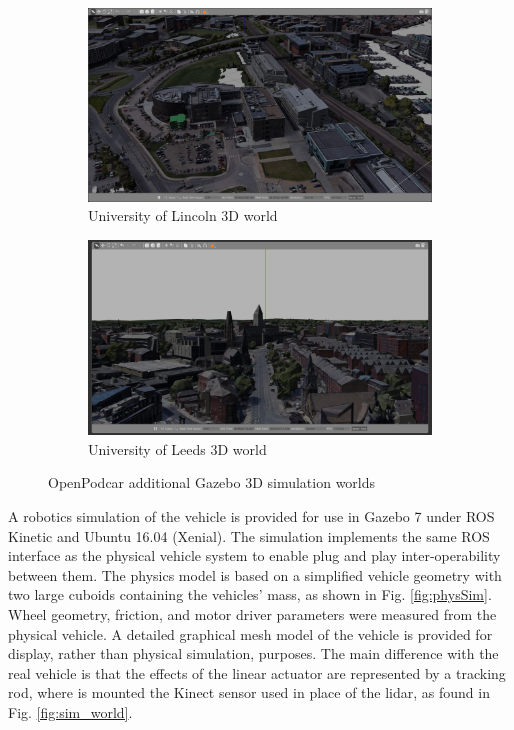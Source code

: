 \documentclass[a4paper]{article}
\begin{document}
	\begin{figure}
		\centering
		\begin{subfigure}{0.45\textwidth}
			\centering
			\includegraphics[width=\columnwidth]{figs_sim/INBLincoln_2.png}
			\caption{University of Lincoln 3D world}
			\label{fig:INB_world}
		\end{subfigure}	
		\quad
		\begin{subfigure}{0.45\textwidth}
			\centering
			\includegraphics[width=\columnwidth]{figs_sim/woodhouseLeeds_5.png}
			\caption{University of Leeds 3D world}
			\label{fig:Leeds_world}
		\end{subfigure}	
		\caption{OpenPodcar additional Gazebo 3D simulation worlds}
		\label{fig:gazebo_new_worlds}
	\end{figure}
	
	A robotics simulation of the vehicle is provided for use in Gazebo 7 \cite{koenig2004design} under ROS Kinetic and Ubuntu 16.04 (Xenial). The simulation implements the same ROS interface as the physical vehicle system to enable plug and play inter-operability between them. The physics model is based on a simplified vehicle geometry with two large cuboids containing the vehicles’ mass, as shown in Fig. \ref{fig:physSim}. Wheel geometry, friction, and motor driver parameters were measured from the physical vehicle. A detailed graphical mesh model of the vehicle is provided for display, rather than physical simulation, purposes. The main difference with the real vehicle is that the effects of the linear actuator are represented by a tracking rod, where is mounted the Kinect sensor used in place of the lidar, as found in Fig. \ref{fig:sim_world}.
	
\end{document}
